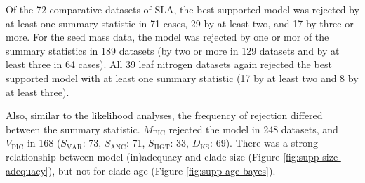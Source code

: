 \documentclass[a4paper,12pt]{article}
\begin{document}
Of the 72 comparative datasets of SLA, the best supported model was rejected by at least one summary statistic in 71 cases, 29 by at least two, and 17 by three or more.
For the seed mass data, the model was rejected by one or mor of the summary statistics in 189 datasets (by two or more in 129 datasets and by at least three in 64 cases).
All 39 leaf nitrogen datasets again rejected the best supported model with at least one summary statistic (17 by at least two and 8 by at least three).

Also, similar to the likelihood analyses, the frequency of rejection differed between the summary statistic. $M_{\text{PIC}}$ rejected the model in 248 datasets, and $V_{\text{PIC}}$ in 168 ($S_{\text{VAR}}$: 73, $S_{\text{ANC}}$: 71, $S_{\text{HGT}}$: 33, $D_{\text{KS}}$: 69). There was a strong relationship between model (in)adequacy and clade size (Figure \ref{fig:supp-size-adequacy}), but not for clade age (Figure \ref{fig:supp-age-bayes}).
 

\newpage


\end{document}
